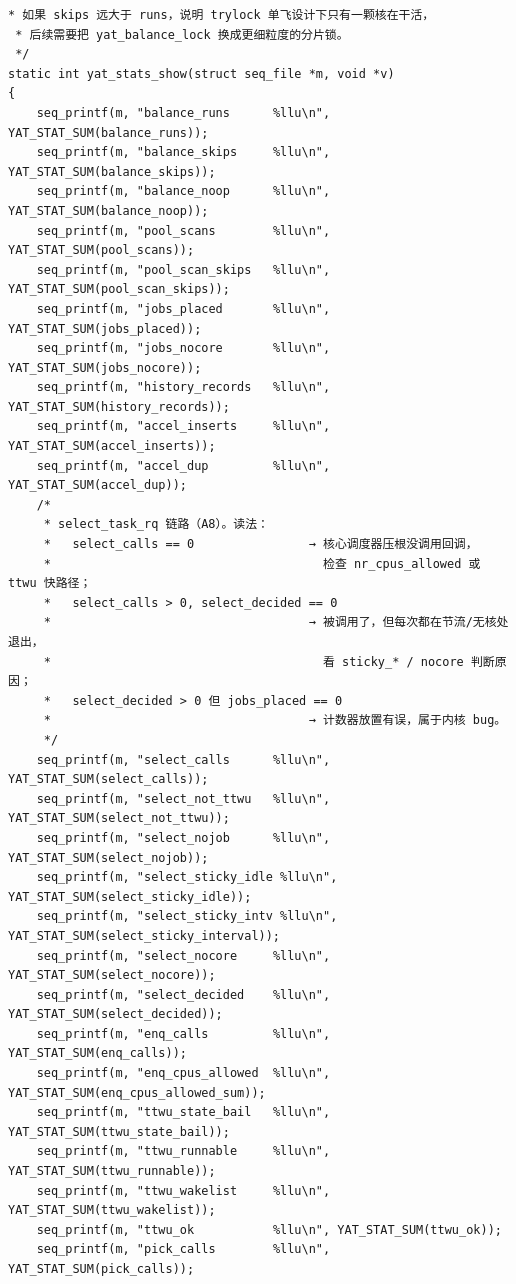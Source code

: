 \documentclass[10pt,a4paper]{article}
\newenvironment{yatpage}{\vspace*{0pt}}{\par}
\begin{document}
\begin{yatpage}
\begin{Verbatim}[fontsize=\fontsize{8.2}{9.8}\selectfont]
 * 如果 skips 远大于 runs，说明 trylock 单飞设计下只有一颗核在干活，
 * 后续需要把 yat_balance_lock 换成更细粒度的分片锁。
 */
static int yat_stats_show(struct seq_file *m, void *v)
{
	seq_printf(m, "balance_runs      %llu\n", YAT_STAT_SUM(balance_runs));
	seq_printf(m, "balance_skips     %llu\n", YAT_STAT_SUM(balance_skips));
	seq_printf(m, "balance_noop      %llu\n", YAT_STAT_SUM(balance_noop));
	seq_printf(m, "pool_scans        %llu\n", YAT_STAT_SUM(pool_scans));
	seq_printf(m, "pool_scan_skips   %llu\n", YAT_STAT_SUM(pool_scan_skips));
	seq_printf(m, "jobs_placed       %llu\n", YAT_STAT_SUM(jobs_placed));
	seq_printf(m, "jobs_nocore       %llu\n", YAT_STAT_SUM(jobs_nocore));
	seq_printf(m, "history_records   %llu\n", YAT_STAT_SUM(history_records));
	seq_printf(m, "accel_inserts     %llu\n", YAT_STAT_SUM(accel_inserts));
	seq_printf(m, "accel_dup         %llu\n", YAT_STAT_SUM(accel_dup));
	/*
	 * select_task_rq 链路（A8）。读法：
	 *   select_calls == 0                → 核心调度器压根没调用回调，
	 *                                      检查 nr_cpus_allowed 或 ttwu 快路径；
	 *   select_calls > 0, select_decided == 0
	 *                                    → 被调用了，但每次都在节流/无核处退出，
	 *                                      看 sticky_* / nocore 判断原因；
	 *   select_decided > 0 但 jobs_placed == 0
	 *                                    → 计数器放置有误，属于内核 bug。
	 */
	seq_printf(m, "select_calls      %llu\n", YAT_STAT_SUM(select_calls));
	seq_printf(m, "select_not_ttwu   %llu\n", YAT_STAT_SUM(select_not_ttwu));
	seq_printf(m, "select_nojob      %llu\n", YAT_STAT_SUM(select_nojob));
	seq_printf(m, "select_sticky_idle %llu\n", YAT_STAT_SUM(select_sticky_idle));
	seq_printf(m, "select_sticky_intv %llu\n", YAT_STAT_SUM(select_sticky_interval));
	seq_printf(m, "select_nocore     %llu\n", YAT_STAT_SUM(select_nocore));
	seq_printf(m, "select_decided    %llu\n", YAT_STAT_SUM(select_decided));
	seq_printf(m, "enq_calls         %llu\n", YAT_STAT_SUM(enq_calls));
	seq_printf(m, "enq_cpus_allowed  %llu\n", YAT_STAT_SUM(enq_cpus_allowed_sum));
	seq_printf(m, "ttwu_state_bail   %llu\n", YAT_STAT_SUM(ttwu_state_bail));
	seq_printf(m, "ttwu_runnable     %llu\n", YAT_STAT_SUM(ttwu_runnable));
	seq_printf(m, "ttwu_wakelist     %llu\n", YAT_STAT_SUM(ttwu_wakelist));
	seq_printf(m, "ttwu_ok           %llu\n", YAT_STAT_SUM(ttwu_ok));
	seq_printf(m, "pick_calls        %llu\n", YAT_STAT_SUM(pick_calls));

\end{Verbatim}
\end{yatpage}
\end{document}
